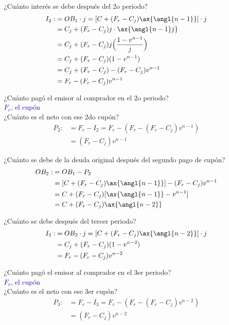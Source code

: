 ¿Cuánto interés se debe después del 2o periodo?
\begin{align*}
    I_2 :&= OB_1\cdot j = [C + (F_r-C_j)\ax{\angl{n-1}}]\cdot j\\
    &= C_j + (F_r-C_j)j\cdot\ax{\angl{n-1}j}\\
    &= C_j + (F_r -C_j)j\Big(\frac{1-v^{n-1}}{j}\Big)\\
    &= C_j + (F_r-C_j)(1-v^{n-1})\\
    &= C_j+(F_r-C_j)-(F_r-C_j)v^{n-1}\\
    &= F_r - (F_r-C_j)v^{n-1}
\end{align*}

¿Cuánto pagó el emisor al comprador en el 2o periodo?\\
\textcolor{blue}{$F_r$, el cupón}\\

¿Cuánto es el neto con ese 2do cupón?
\begin{align*}
    P_2 :&= F_r - I_2 = F_r-(F_r-(F_r-C_j)v^{n-1})\\
    &= (F_r-C_j)v^{n-1}
\end{align*}

¿Cuánto se debe de la deuda original después del segundo pago de cupón?
\begin{align*}
    OB_2 :&= OB_1-P_2\\
    &= [C+(F_r-C_j)\ax{\angl{n-1}}] - (F_r-C_j)v^{n-1}\\
    &= C+(F_r-C_j)[\ax{\angl{n-1}}-v^{n-1}]\\
    &= C+(F_r-C_j)\ax{\angl{n-2}}
\end{align*}

¿Cuánto se debe después del tercer periodo?
\begin{align*}
    I_3 :&= OB_2\cdot j = [C + (F_r-C_j)\ax{\angl{n-2}}]\cdot j\\
    &= C_j + (F_r-C_j)(1-v^{n-2})\\
    &= F_r - (F_r-C_j)v^{n-2}
\end{align*}

¿Cuánto pagó el emisor al comprador en el 3er periodo?\\
\textcolor{blue}{$F_r$, el cupón}\\

¿Cuánto es el neto con ese 3er cupón?
\begin{align*}
    P_3 :&= F_r - I_3 = F_r-(F_r-(F_r-C_j)v^{n-2})\\
    &= (F_r-C_j)v^{n-2}
\end{align*}

